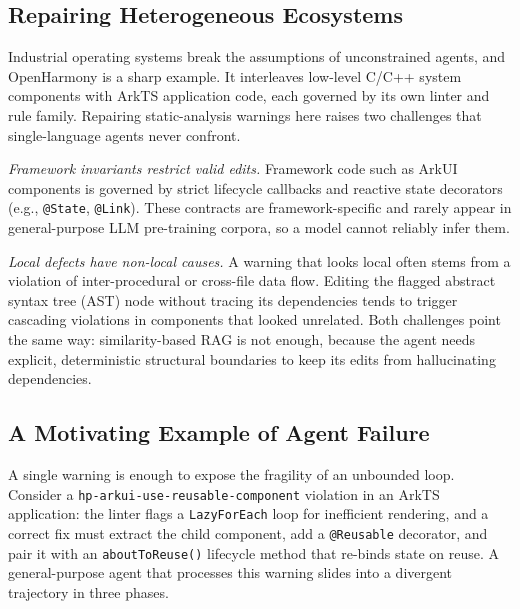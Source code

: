 \documentclass[10pt,conference]{IEEEtran}
\begin{document}
\subsection{Repairing Heterogeneous Ecosystems}
\label{sec:bg_oh}

Industrial operating systems break the assumptions of unconstrained agents, and OpenHarmony is a sharp example. It interleaves low-level C/C++ system components with ArkTS application code, each governed by its own linter and rule family. Repairing static-analysis warnings here raises two challenges that single-language agents never confront.

\textit{Framework invariants restrict valid edits.} Framework code such as ArkUI components is governed by strict lifecycle callbacks and reactive state decorators (e.g., \texttt{@State}, \texttt{@Link}). These contracts are framework-specific and rarely appear in general-purpose LLM pre-training corpora, so a model cannot reliably infer them.

\textit{Local defects have non-local causes.} A warning that looks local often stems from a violation of inter-procedural or cross-file data flow. Editing the flagged abstract syntax tree (AST) node without tracing its dependencies tends to trigger cascading violations in components that looked unrelated. Both challenges point the same way: similarity-based RAG is not enough, because the agent needs explicit, deterministic structural boundaries to keep its edits from hallucinating dependencies.

\subsection{A Motivating Example of Agent Failure}
\label{sec:bg_motivating}

A single warning is enough to expose the fragility of an unbounded loop. Consider a \texttt{hp-arkui-use-reusable-component} violation in an ArkTS application: the linter flags a \texttt{LazyForEach} loop for inefficient rendering, and a correct fix must extract the child component, add a \texttt{@Reusable} decorator, and pair it with an \texttt{aboutToReuse()} lifecycle method that re-binds state on reuse. A general-purpose agent that processes this warning slides into a divergent trajectory in three phases.
\end{document}
